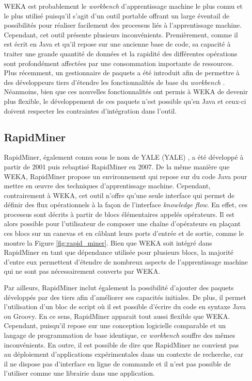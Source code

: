 \acs{WEKA} est probablement le \textit{workbench} d'apprentissage machine le plus connu et le plus utilisé puisqu'il s'agit d'un outil portable \citep{Bouckaert2010} offrant un large éventail de possibilités pour réaliser facilement des processus liés à l'apprentissage machine. Cependant, cet outil présente plusieurs inconvénients. Premièrement, comme il est écrit en Java et qu'il repose sur une ancienne base de code, sa capacité à traiter une grande quantité de données et la rapidité des différentes opérations sont profondément affectées par une consommation importante de ressources. Plus récemment, un gestionnaire de paquets a été introduit afin de permettre à des développeurs tiers d'étendre les fonctionnalités de base du \textit{workbench} \citep{Hall2009}. Néanmoins, bien que ces nouvelles fonctionnalités ont permis à \acs{WEKA} de devenir plus flexible, le développement de ces paquets n'est possible qu'en Java et ceux-ci doivent respecter les contraintes d'intégration dans l'outil.

\subsection{RapidMiner}

RapidMiner, également connu sous le nom de \acs{YALE} (\acl{YALE}) \citep{Ritthoo2003,Hofmann2014}, a été développé à partir de 2001 puis rebaptisé RapidMiner en 2007. De la même manière que \acs{WEKA}, RapidMiner propose un environnement qui repose sur du code Java pour mettre en \oe{}uvre des techniques d'apprentissage machine. Cependant, contrairement à \acs{WEKA}, cet outil n'offre qu'une seule interface qui permet de définir des flux opérationnels à la façon de l'interface \textit{knowledge flow}. En effet, ces processus sont décrits à partir de blocs élémentaires appelés opérateurs. Il est alors possible pour l'utilisateur de composer une chaîne d'opérateurs en plaçant ces blocs sur un canevas et en câblant leurs ports d'entrée et de sortie, comme le montre la Figure \ref{fig:rapid_miner}. Bien que \acs{WEKA} soit intégré dans RapidMiner en tant que dépendance utilisée pour plusieurs blocs, la majorité d'entre eux permettent d'étendre de nombreux aspects de l'apprentissage machine qui ne sont pas nécessairement couverts par \acs{WEKA}.

Par ailleurs, RapidMiner inclut également la possibilité d'ajouter des paquets développés par des tiers afin d'améliorer ses capacités initiales. De plus, il permet l'utilisation d'un bloc de script où il est possible d'écrire du code en syntaxe Java ou Groovy. En ce sens, RapidMiner apparait tout aussi flexible que \acs{WEKA}. Cependant, puisqu'il repose sur une conception logicielle comparable et un langage de programmation de base identique, ce \textit{workbench} souffre des mêmes inconvénients. En outre, il est possible de dire que RapidMiner ne convient pas au déploiement d'applications expérimentales dans un contexte de recherche, car il ne dispose pas d'interface en ligne de commande et il n'est pas possible de l'utiliser comme une librairie dans une application.

